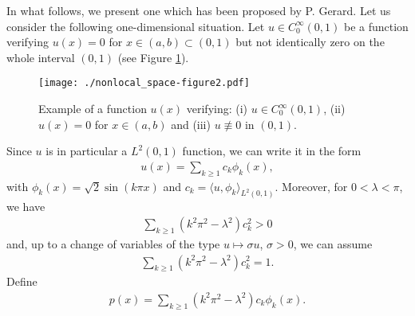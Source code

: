 \documentclass[preprint,1p]{elsarticle}
\begin{document}
In what follows, we present one which has been proposed by P. Gerard. Let us consider the following one-dimensional situation. Let $u\in C_0^\infty(0,1)$ be a function verifying $u(x)=0$ for $x\in(a,b)\subset(0,1)$ but not identically zero on the whole interval $(0,1)$ (see Figure \ref{figure_u}). 
%

\begin{figure}[h]
\centering
\texttt{[image: ./nonlocal\_space-figure2.pdf]}
\caption{Example of a function $u(x)$ verifying: (i) $u\in C_0^\infty(0,1)$, (ii) $u(x)=0$ for $x\in(a,b)$ and (iii) $u\not\equiv 0$ in $(0,1).$}\label{figure_u}
\end{figure}

Since $u$ is in particular a $L^2(0,1)$ function, we can write it in the form
\begin{align*}
	u(x)=\sum_{k\geq 1} c_k\phi_k(x),
\end{align*}
with $\phi_k(x)=\sqrt{2}\sin(k\pi x)$ and $c_k=\langle u,\phi_k\rangle_{L^2(0,1)}$. Moreover, for $0<\lambda<\pi$, we have 
\begin{align*}
	\sum_{k\geq 1}\left(k^2\pi^2-\lambda^2\right)c_k^2 >0
\end{align*}
and, up to a change of variables of the type $u\mapsto\sigma u$, $\sigma>0$, we can assume 
\begin{align*}
	\sum_{k\geq 1}\left(k^2\pi^2-\lambda^2\right)c_k^2 =1.
\end{align*}	
Define
\begin{align*}
	p(x) = \sum_{k\geq 1} \left(k^2\pi^2-\lambda^2\right)c_k\phi_k(x).
\end{align*}
\end{document}
